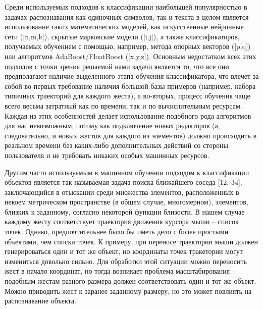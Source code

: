 \documentclass[a5paper]{article}
\begin{document}
Среди используемых подходов к классификации наибольшей популярностью в задачах распознавания как одиночных символов, так и текста в целом является 
использование таких математических моделей, как искусственные нейронные сети ([n,m,k]), скрытые марковские модели ([i,j]), а также  
классификаторов, получаемых обучением с помощью, например, метода опорных векторов ([p,q]) или алгоритмов AdaBoost/FloatBoost ([x,y,z]). 
Основным недостатком всех этих подходов с точки зрения решаемой нами задачи является то, что все они предполагают наличие выделенного этапа 
обучения классификатора, что влечет за собой во-первых требование наличия большой базы примеров (например, набора 
типичных траекторий для каждого жеста), а во-вторых, процесс обучения чаще всего весьма затратный как по времени, так и по вычислительным 
ресурсам. Каждая из этих особенностей делает использование подобного рода алгоритмов для нас невозможным, потому как подключение новых 
редакторов (а, следовательно, и новых жестов для каждого из элементов) должно происходить в реальном времени без каких-либо дополнительных 
действий со стороны пользователя и не требовать никаких особых машинных ресурсов. 

Другим часто используемым в машинном обучении подходом к классификации объектов является так называемая задача поиска ближайшего соседа 
[12, 34], заключающийся в отыскании среди множества элементов, расположенных в некоем метрическом пространстве (в общем случае, многомерном), 
элементов, близких к заданному, согласно некоторой функции близости. В нашем случае каждому жесту соответствует траектория движения курсора 
мыши -- список точек. Однако, предпочтительнее было бы иметь дело с более простыми 
объектами, чем списки точек. К примеру, при переносе траектории мыши должен генерироваться один и тот же объект, но координаты точек 
тракетории могут измениться довольно сильно. Для обработки этой ситуации можно переносить жест в начало координат, но тогда возникает проблема
масштабирования -- подобным жестам разного размера должен соответствовать один и тот же объект. Можно приводить жест к заранее 
заданному размеру, но это может повлиять на распознавание объекта.
\end{document}
